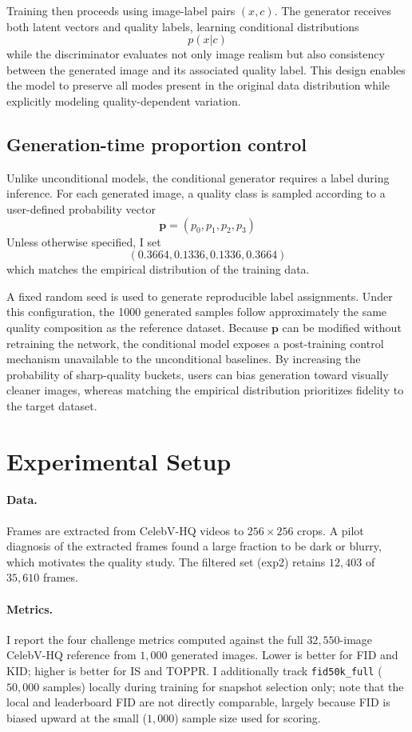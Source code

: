 \documentclass{article}
\begin{document}
Training then proceeds using image-label pairs $(x,c)$. The generator receives both latent vectors and quality labels, learning conditional distributions
\[ p(x|c) \]
while the discriminator evaluates not only image realism but also consistency between the generated image and its associated quality label. This design enables the model to preserve all modes present in the original data distribution while explicitly modeling quality-dependent variation.

\subsection{Generation-time proportion control}
Unlike unconditional models, the conditional generator requires a label during inference. For each generated image, a quality class is sampled according to a user-defined probability vector
\[ \mathbf{p} = (p_0, p_1, p_2, p_3) \]
Unless otherwise specified, I set
\[ (0.3664, 0.1336, 0.1336, 0.3664) \]
which matches the empirical distribution of the training data.

A fixed random seed is used to generate reproducible label assignments. Under this configuration, the 1000 generated samples follow approximately the same quality composition as the reference dataset. Because $\mathbf{p}$ can be modified without retraining the network, the conditional model exposes a post-training control mechanism unavailable to the unconditional baselines. By increasing the probability of sharp-quality buckets, users can bias generation toward visually cleaner images, whereas matching the empirical distribution prioritizes fidelity to the target dataset.

\section{Experimental Setup}
\paragraph{Data.}
Frames are extracted from CelebV-HQ videos to $256\times256$ crops. A pilot
diagnosis of the extracted frames found a large fraction to be dark or blurry,
which motivates the quality study. The filtered set (exp2) retains $12{,}403$ of
$35{,}610$ frames.

\paragraph{Metrics.}
I report the four challenge metrics computed against the full $32{,}550$-image
CelebV-HQ reference from $1{,}000$ generated images. Lower is better for FID and
KID; higher is better for IS and TOPPR. I additionally track
\texttt{fid50k\_full} ($50{,}000$ samples) locally during training for
snapshot selection only; note that the local and leaderboard FID are not
directly comparable, largely because FID is biased upward at the small
($1{,}000$) sample size used for scoring.
\end{document}
